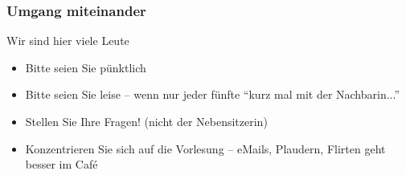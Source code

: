 \documentclass{../../presentation}
\begin{document}
\begin{frame}[fragile]
  \frametitle{Umgang miteinander}
  Wir sind hier viele Leute
  \begin{itemize}
    \item Bitte seien Sie pünktlich
    \item Bitte seien Sie leise -- wenn nur jeder fünfte \enquote{kurz mal mit der Nachbarin...}
    \item Stellen Sie Ihre Fragen! (nicht der Nebensitzerin)
    \item Konzentrieren Sie sich auf die Vorlesung -- eMails, Plaudern, Flirten geht besser im Café
  \end{itemize}
\end{frame}
\end{document}
